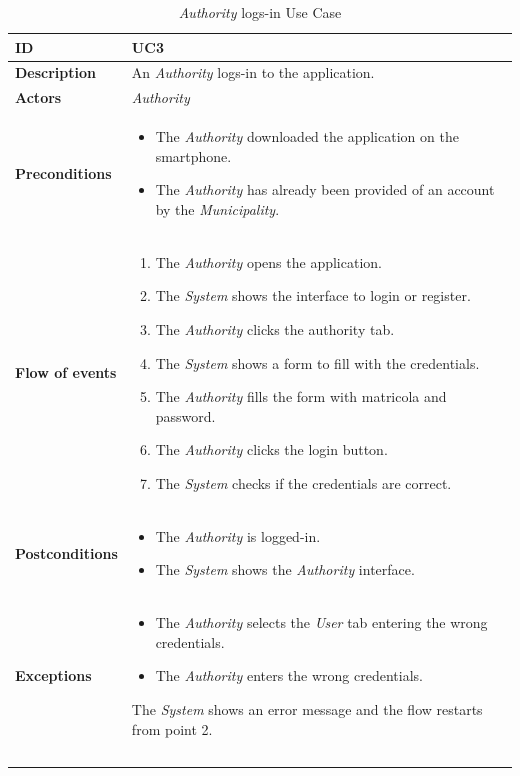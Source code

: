\documentclass {article}
\begin{document}
	\begin{longtable}{| p{3 cm} | p{10.5 cm} |} 
			\hline
			{\bf ID} & UC3 \\
			\hline
			{\bf Description} & An {\it Authority} logs-in to the application. \\
			\hline
			{\bf Actors} & {\it Authority} \\
			\hline
			{\bf Preconditions} & 	
			\begin{itemize}
				\item The {\it Authority} downloaded the application on the smartphone.
				\item The {\it Authority} has already been provided of an account by the {\it Municipality}.
			\end{itemize}
			\\
			\hline
			{\bf Flow of events} &	
			\begin{enumerate}
				\item The {\it Authority} opens the application.
				\item The {\it System} shows the interface to login or register.
				\item The {\it Authority} clicks the authority tab.
				\item The {\it System} shows a form to fill with the credentials.
				\item The {\it Authority} fills the form with matricola and password. 
				\item The {\it Authority} clicks the login button.
				\item The {\it System} checks if the credentials are correct. 
			\end{enumerate}
			\\
			\hline
			{\bf Postconditions} & 
			\begin{itemize}
				\item The {\it Authority} is logged-in.
				\item The {\it System} shows the {\it Authority} interface.
			\end{itemize}
			\\
			\hline
			{\bf Exceptions} & 	
			\begin{itemize}
				\item The {\it Authority} selects the {\it User} tab entering the wrong credentials.
				\item The {\it Authority} enters the wrong credentials.
			\end{itemize}
			The {\it System} shows an error message and the flow restarts from point 2.
			\\ \\
			\hline
			\caption{{\it Authority} logs-in Use Case}
			\end{longtable}
\end{document}
